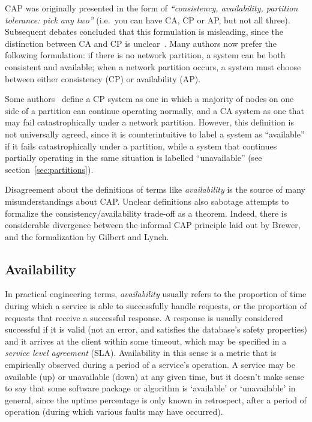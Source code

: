 \documentclass[a4paper,twocolumn,10pt]{article}
\begin{document}
CAP was originally presented in the form of \emph{``consistency, availability, partition tolerance:
pick any two''} (i.e.\ you can have CA, CP or AP, but not all three). Subsequent debates concluded
that this formulation is misleading, since the distinction between CA and CP is
unclear~\cite{Brewer2012ba, Hale2010we, Robinson2010tp}. Many authors now prefer the following
formulation: if there is no network partition, a system can be both consistent and available; when a
network partition occurs, a system must choose between either consistency (CP) or availability (AP).

Some authors~\cite{Darcy2010ta, Liochon2015vt} define a CP system as one in which a majority of
nodes on one side of a partition can continue operating normally, and a CA system as one that may
fail catastrophically under a network partition. However, this definition is not universally agreed,
since it is counterintuitive to label a system as ``available'' if it fails catastrophically under a
partition, while a system that continues partially operating in the same situation is labelled
``unavailable'' (see section~\ref{sec:partitions}).

Disagreement about the definitions of terms like \emph{availability} is the source of many
misunderstandings about CAP. Unclear definitions also sabotage attempts to formalize the
consistency/availability trade-off as a theorem. Indeed, there is considerable divergence between
the informal CAP principle laid out by Brewer, and the formalization by Gilbert and Lynch.

\subsection{Availability}\label{sec:availability}

In practical engineering terms, \emph{availability} usually refers to the proportion of time during
which a service is able to successfully handle requests, or the proportion of requests that receive
a successful response. A response is usually considered successful if it is valid (not an error, and
satisfies the database's safety properties) and it arrives at the client within some timeout, which
may be specified in a \emph{service level agreement} (SLA). Availability in this sense is a metric
that is empirically observed during a period of a service's operation. A service may be available
(up) or unavailable (down) at any given time, but it doesn't make sense to say that some software
package or algorithm is `available' or `unavailable' in general, since the uptime percentage is
only known in retrospect, after a period of operation (during which various faults may have
occurred).
\end{document}
